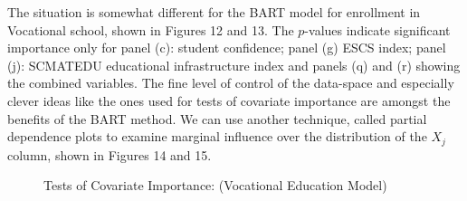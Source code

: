 \documentclass[alpha-refs,fleqn]{wiley-article_p2}
\begin{document}
The situation is somewhat different for the BART model for enrollment in Vocational school, shown in Figures 12 and 13. The $p$-values indicate significant importance only for panel (c): student confidence; panel (g) ESCS index; panel (j): SCMATEDU educational infrastructure index and panels (q) and (r) showing the combined variables. The fine level of control of the data-space and especially clever ideas like the ones used for tests of covariate importance are amongst the benefits of the BART method. We can use another technique, called partial dependence plots to examine marginal influence over the distribution of the $X_j$ column, shown in Figures 14 and 15. 

\begin{group} 
\begin{figure}[htbp!]
\begin{subfigure}[Panel A. Female Gender]{
\texttt{[image: cFig3w01.png]}}
\end{subfigure}
\begin{subfigure}[Panel B. Pre-School]{
\texttt{[image: cFig3w03.png]}}
\end{subfigure}
\begin{subfigure}[Panel C. Student Confidence]{
\texttt{[image: cFig3w04.png]}}
\end{subfigure}
\begin{subfigure}[Panel D. Student Outlook]{
\texttt{[image: cFig3w05.png]}}
\end{subfigure}
\begin{subfigure}[Panel E. Homework minutes ]{
\texttt{[image: cFig3w06.png]}}
\end{subfigure}
\begin{subfigure}[Panel F. Cultural Possessions ]{
\texttt{[image: cFig3w07.png]}}
\end{subfigure}
\begin{subfigure}[Panel G. ESCS Index ]{
\texttt{[image: cFig3w08.png]}}
\end{subfigure}
\begin{subfigure}[Panel H. ICTHOME ]{
\texttt{[image: cFig3w09.png]}}
\end{subfigure}
\begin{subfigure}[Panel I. ENTUSE Computers]{
\texttt{[image: cFig3w10.png]}}
\end{subfigure}
\begin{subfigure}[Panel J. SCMATEDU Infrastructure ]{
\texttt{[image: cFig3w11.png]}}
\end{subfigure}
\begin{subfigure}[Panel K. TCSHORT]{
\texttt{[image: cFig3w12.png]}}
\end{subfigure}
\begin{subfigure}[Panel L. ECACT]{
\texttt{[image: cFig3w13.png]}}
\end{subfigure}
\caption{Tests of Covariate Importance: (Vocational Education Model) }\label{fig:1}
\end{figure}
\end{group} 
\end{document}
